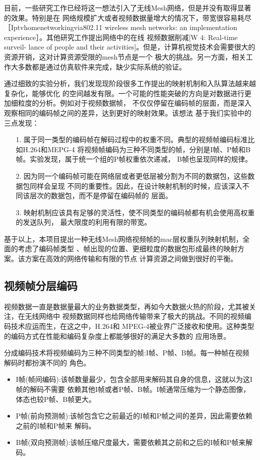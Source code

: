目前，一些研究工作已经将这一想法引入了无线Mesh网络，但是并没有取得显著的效果。特别是在
网络规模扩大或者视频数据量增大的情况下，带宽很容易耗尽［Iptvhomenetworkingvia802.11 
wireless mesh networks: an implementation experience］。其他研究工作提出网络中的在线
视频数据削减[W 4: Real-time surveil- lance of people and their activities]。但是，计算机视觉技术会需要很大的资源开销，这对计算资源受限的mesh节点是一个
极大的挑战。另一方面，相关工作大多数都是通过仿真软件来完成，缺少实际系统的验证。

通过细致的实验分析，我们发现现阶段很多工作提出的映射机制和入队算法越来越复杂化，能够优化
的空间越发有限。一个可能的性能突破的方向是对数据进行更加细粒度的分析。例如对于视频数据帧，
不仅仅停留在编码帧的层面，而是深入观察相同的编码帧之间的差异，达到更好的映射效果。该想法
基于我们实验中的三点发现：
\begin{itemize}
\item[1.] 属于同一类型的编码帧在解码过程中的权重不同。典型的视频帧编码标准比如H.264和MEPG-4
将视频帧编码为三种不同类型的帧，分别是I帧、P帧和B帧。实验发现，属于统一个组的P帧权重依次递减，
B帧也呈现同样的规律。
\item[2.] 因为同一个编码帧可能在网络层或者更低层被分割为不同的数据包，这些数据包同样会呈现
不同的重要性。因此，在设计映射机制的时候，应该深入不同该层次的数据包，而不是停留在编码帧的
层面。
\item[3.] 映射机制应该具有足够的灵活性，使不同类型的编码帧都有机会使用高权重的发送队列，
最大限度的利用有限的带宽。
\end{itemize}

基于以上，本项目提出一种无线Mesh网络视频帧的mac层权重队列映射机制，全面的考虑了编码帧类型
、帧出现的位置、更细粒度的数据包形成最终的映射方案。该方案在高效的网络传输和有限的节点
计算资源之间做到很好的平衡。

\subsection{视频帧分层编码}
视频数据一直是数据量最大的业务数据类型，再如今大数据火热的阶段，尤其被关注，在无线网络中
视频数据同样也给网络传输带来了极大的挑战。不同的视频编码技术应运而生，在这之中，H.264和
MPEG-4被业界广泛接收和使用。这种类型的编码方式在性能和编码复杂度上都能够很好的满足大多数的
应用场景。

分成编码技术将视频编码为三种不同类型的帧:I帧、P帧、B帧。每一种帧在视频解码时都扮演不同的
角色。
\begin{itemize}
\item I帧(帧间编码):该帧数量最少，包含全部用来解码其自身的信息，这就以为这I帧的解码不需要
依赖其他I帧或者P帧、B帧。I帧通常压缩为一个静态图像，体态也较P帧、B帧更大。
\item P帧(前向预测帧):该帧包含它之前最近的I帧和P帧之间的差异，因此需要依赖之前的I帧和P帧来
解码。
\item B帧(双向预测帧):该帧压缩尺度最大，需要依赖其之前和之后的I帧和P帧来解码。
\end{itemize}


